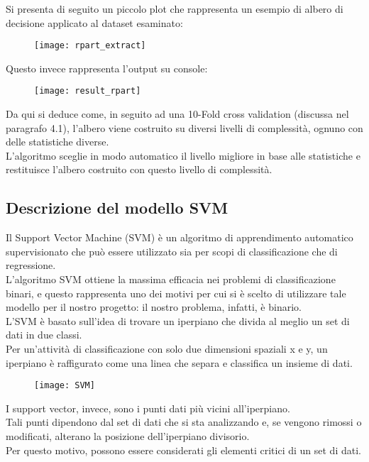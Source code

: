 Si presenta di seguito un piccolo plot che rappresenta un esempio di albero di decisione applicato al dataset esaminato:

\begin{figure}[H]
	\centering
	\texttt{[image: rpart\_extract]}
\end{figure}

Questo invece rappresenta l'output su console:

\begin{figure}[H]
	\centering
	\texttt{[image: result\_rpart]}
\end{figure}

Da qui si deduce come, in seguito ad una 10-Fold cross validation (discussa nel paragrafo 4.1), l'albero viene costruito su diversi livelli di complessità, ognuno con delle statistiche diverse. \\L'algoritmo sceglie in modo automatico il livello migliore in base alle statistiche e restituisce l'albero costruito con questo livello di complessità.

\subsection{Descrizione del modello SVM}

Il Support Vector Machine (SVM) è un algoritmo di apprendimento automatico supervisionato che può essere utilizzato sia per scopi di classificazione che di regressione. \\
L’algoritmo SVM ottiene la massima efficacia nei problemi di classificazione binari, e questo rappresenta uno dei motivi per cui si è scelto di utilizzare tale modello per il nostro progetto: il nostro problema, infatti, è binario. \\
L’SVM è basato sull’idea di trovare un iperpiano che divida al meglio un set di dati in due classi.\\
Per un’attività di classificazione con solo due dimensioni spaziali x e y, un iperpiano è raffigurato come una linea che separa e classifica un insieme di dati.

\begin{figure}[H]
	\centering
	\texttt{[image: SVM]}
\end{figure}

I support vector, invece, sono i punti dati più vicini all’iperpiano. \\Tali punti dipendono dal set di dati che si sta analizzando e, se vengono rimossi o modificati, alterano la posizione dell’iperpiano divisorio.\\ Per questo motivo, possono essere considerati gli elementi critici di un set di dati.

